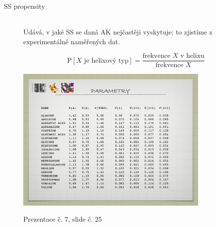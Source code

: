 \documentclass[DIV=8]{scrreprt}
\begin{document}
\begin{description}
\item[SS propensity]\hfill \\
Udává, v jaké SS se daná AK nejčastěji vyskytuje; to zjistíme z experimentálně naměřených dat.

\[\text{P}[X \text{ je helixový typ}] = \frac{\text{frekvence } X \text{ v helixu}}{\text{frekvence } X}\]

\end{description}


\begin{figure}
    \caption{Prezentace č. 7, slide č. 25}
    \includegraphics[width=0.85\textwidth]{slides-7/slide-25.jpg}
    \centering
    \label{slides-7-slide-25}
\end{figure}
\end{document}
